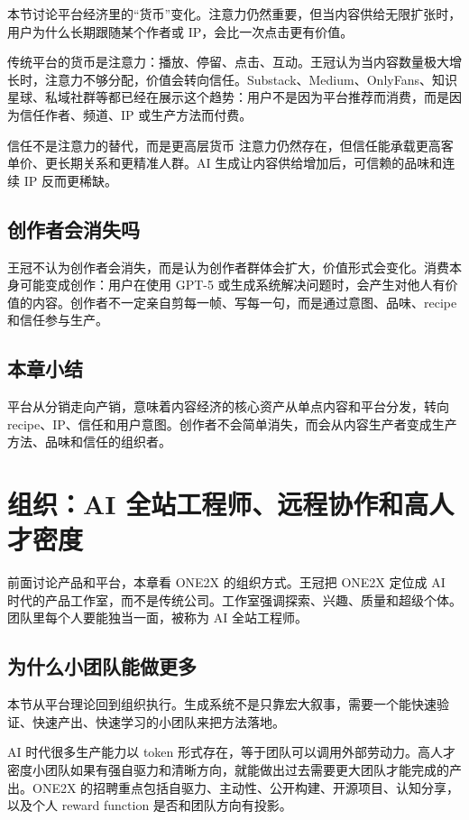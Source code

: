 \documentclass[a4paper]{article}
\begin{document}
本节讨论平台经济里的“货币”变化。注意力仍然重要，但当内容供给无限扩张时，用户为什么长期跟随某个作者或 IP，会比一次点击更有价值。

传统平台的货币是注意力：播放、停留、点击、互动。王冠认为当内容数量极大增长时，注意力不够分配，价值会转向信任。Substack、Medium、OnlyFans、知识星球、私域社群等都已经在展示这个趋势：用户不是因为平台推荐而消费，而是因为信任作者、频道、IP 或生产方法而付费。

\begin{warningbox}{信任不是注意力的替代，而是更高层货币}
注意力仍然存在，但信任能承载更高客单价、更长期关系和更精准人群。AI 生成让内容供给增加后，可信赖的品味和连续 IP 反而更稀缺。
\end{warningbox}

\subsection{创作者会消失吗}

王冠不认为创作者会消失，而是认为创作者群体会扩大，价值形式会变化。消费本身可能变成创作：用户在使用 GPT-5 或生成系统解决问题时，会产生对他人有价值的内容。创作者不一定亲自剪每一帧、写每一句，而是通过意图、品味、recipe 和信任参与生产。

\subsection{本章小结}

平台从分销走向产销，意味着内容经济的核心资产从单点内容和平台分发，转向 recipe、IP、信任和用户意图。创作者不会简单消失，而会从内容生产者变成生产方法、品味和信任的组织者。

\section{组织：AI 全站工程师、远程协作和高人才密度}

前面讨论产品和平台，本章看 ONE2X 的组织方式。王冠把 ONE2X 定位成 AI 时代的产品工作室，而不是传统公司。工作室强调探索、兴趣、质量和超级个体。团队里每个人要能独当一面，被称为 AI 全站工程师。

\subsection{为什么小团队能做更多}

本节从平台理论回到组织执行。生成系统不是只靠宏大叙事，需要一个能快速验证、快速产出、快速学习的小团队来把方法落地。

AI 时代很多生产能力以 token 形式存在，等于团队可以调用外部劳动力。高人才密度小团队如果有强自驱力和清晰方向，就能做出过去需要更大团队才能完成的产出。ONE2X 的招聘重点包括自驱力、主动性、公开构建、开源项目、认知分享，以及个人 reward function 是否和团队方向有投影。
\end{document}

